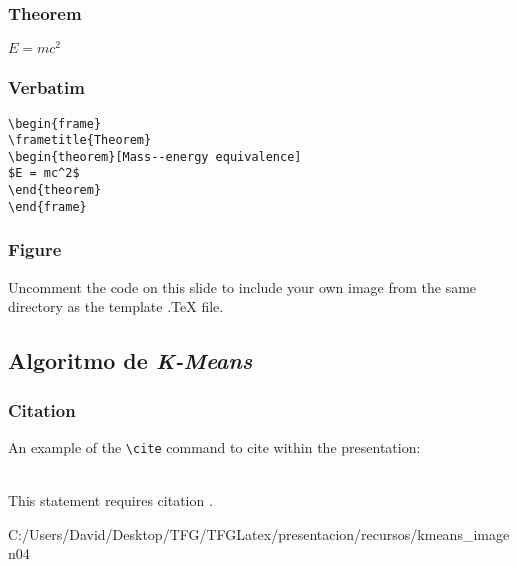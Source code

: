 \documentclass{beamer}
\begin{document}
\begin{frame}
\frametitle{Theorem}
\begin{theorem}
$E = mc^2$
\end{theorem}
\end{frame}


\begin{frame}[fragile] %
\frametitle{Verbatim}
\begin{example}
\begin{verbatim}
\begin{frame}
\frametitle{Theorem}
\begin{theorem}[Mass--energy equivalence]
$E = mc^2$
\end{theorem}
\end{frame}\end{verbatim}
\end{example}
\end{frame}


\begin{frame}
\frametitle{Figure}
Uncomment the code on this slide to include your own image from the same directory as the template .TeX file.
\end{frame}

\subsection{Algoritmo de \textit{K-Means}}

\begin{frame}[fragile] %
\frametitle{Citation}
An example of the \verb|\cite| command to cite within the presentation:\\~

This statement requires citation \cite{p1}.
\end{frame}

\begin{frame} %
  {C:/Users/David/Desktop/TFG/TFGLatex/presentacion/recursos/kmeans_imagen}{0}{4}
\end{frame}
\end{document}
